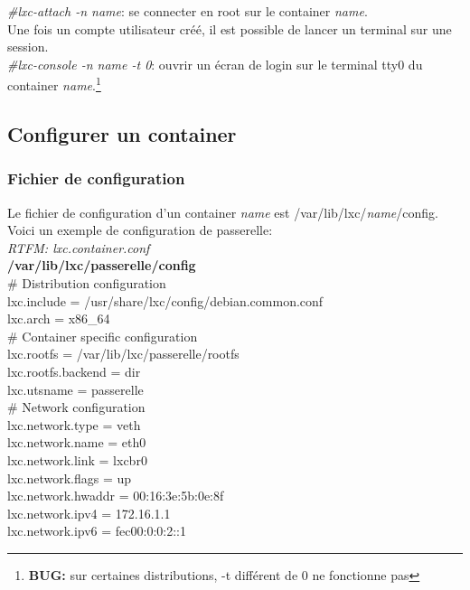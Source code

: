 \documentclass{article}
\begin{document}
\emph{\#lxc-attach -n name}: se connecter en root sur le container \emph{name}.\\
Une fois un compte utilisateur cr\'e\'e, il est possible de lancer un terminal sur une session.\\

\emph{\#lxc-console -n name -t 0}: ouvrir un \'ecran de login sur le terminal tty0 du container \emph{name}.\footnote{\textbf{BUG:} sur certaines distributions, -t diff\'erent de 0 ne fonctionne pas}\\

\subsection{Configurer un container}
\subsubsection{Fichier de configuration}
Le fichier de configuration d'un container \emph{name} est /var/lib/lxc/\emph{name}/config. Voici un exemple de configuration de passerelle:\\
\emph{RTFM: lxc.container.conf}\\

\noindent
\textbf{/var/lib/lxc/passerelle/config}\\

\noindent
\# Distribution configuration\\
lxc.include = /usr/share/lxc/config/debian.common.conf\\
lxc.arch = x86\_64\\

\noindent
\# Container specific configuration\\
lxc.rootfs = /var/lib/lxc/passerelle/rootfs\\
lxc.rootfs.backend = dir\\
lxc.utsname = passerelle\\

\noindent
\# Network configuration\\
lxc.network.type = veth\\
lxc.network.name = eth0\\
lxc.network.link = lxcbr0\\
lxc.network.flags = up\\
lxc.network.hwaddr = 00:16:3e:5b:0e:8f\\
lxc.network.ipv4 = 172.16.1.1\\
lxc.network.ipv6 = fec00:0:0:2::1\\
\end{document}
